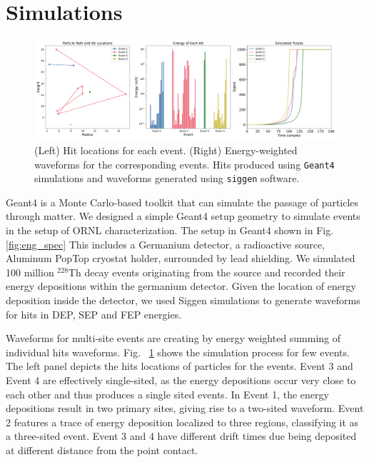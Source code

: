\section{Simulations}


\begin{figure}[htb!]
    \includegraphics[width=0.99\linewidth,trim={1pc 0pc 1pc 0pc},clip]{ch7/figs/hit_sims.pdf}
    \caption{(Left) Hit locations for each event. (Right) Energy-weighted waveforms for the corresponding events. Hits produced using \texttt{Geant4} simulations and waveforms generated using \texttt{siggen} software.}
   \label{fig:eng_dep_sim}
\end{figure}


Geant4 is a Monte Carlo-based toolkit that can simulate the passage of particles through matter. We designed a simple Geant4 setup geometry to simulate events in the setup of ORNL characterization. The setup in  Geant4 shown in Fig. \ref{fig:eng_spec} This includes a Germanium detector, a radioactive source, Aluminum PopTop cryostat holder, surrounded by lead shielding. We simulated 100 million $^{228}$Th decay events originating from the source and recorded their energy depositions within the germanium detector. Given the location of energy deposition inside the detector, we used Siggen simulations to generate waveforms for hits in DEP, SEP and FEP energies.


Waveforms for multi-site events are creating by energy weighted summing of individual hits waveforms. Fig. ~\ref{fig:eng_dep_sim} shows the simulation process for few events. The left panel depicts the hits locations of particles for the events. Event 3 and Event 4 are effectively single-sited, as the energy depositions occur very close to each other and thus produces a single sited events. In Event 1, the energy depositions result in two primary sites, giving rise to a two-sited waveform. Event 2 features a trace of energy deposition localized to three regions, classifying it as a three-sited event. Event 3 and 4 have different drift times due being deposited at different distance from the point contact.

